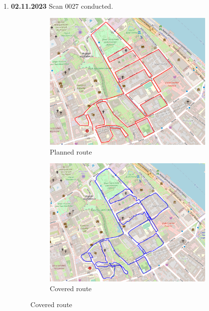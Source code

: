 \documentclass[a4paper,12pt]{book}
\begin{document}
\begin{enumerate}
	\item \textbf{02.11.2023} Scan 0027 conducted.
	\begin{figure}[H]
		\centering
		\begin{subfigure}{.88\textwidth}
			\centering
			\includegraphics[width=1\linewidth]{route_p27}
			\caption{Planned route}
			\label{fig:a27}
		\end{subfigure}%
		\linebreak
		\begin{subfigure}{.88\textwidth}
			\centering
			\includegraphics[width=1\linewidth]{route_c27}
			\caption{Covered route}
			\label{fig:b27}
		\end{subfigure}

\end{figure}
\end{enumerate}
\end{document}
